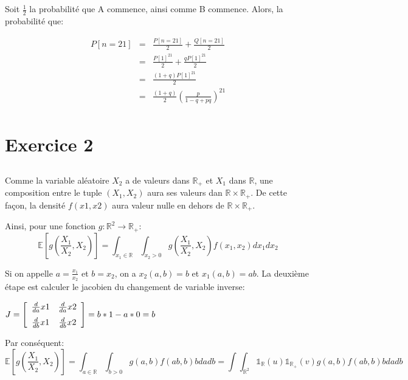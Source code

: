 \documentclass[a4paper]{article}
\begin{document}
\subsection{}
Soit $\frac{1}{2}$ la probabilité que A commence, ainsi comme B commence.
Alors, la probabilité que:

\begin{eqnarray*}
 P[n=21] &=&\frac{P[n=21]}{2}+\frac{Q[n=21]}{2}\\
 &=& \frac{P[1]^{21}}{2}+\frac{qP[1]^{21}}{2}\\
 &=& \frac{(1+q)P[1]^{21}}{2}\\
 &=& \frac{(1+q)}{2}(\frac{p}{1-q+pq})^{21}\\
\end{eqnarray*}



\section{Exercice 2 }
\subsection{}

Comme la variable aléatoire $X_2$ a de valeurs dans $\mathbb{R}_+$ et $X_1$ dans
$\mathbb{R}$, une composition  entre le tuple $(X_1 , X_2)$  aura ses valeurs dan
$\mathbb{R}\times\mathbb{R}_+$. De  cette façon,  la densité $f(x1,  x2)$ aura
valeur nulle en dehors de $\mathbb{R}\times\mathbb{R}_+$.

Ainsi, pour une fonction $g:\mathbb{R}^2 \rightarrow \mathbb{R}_+$:
\begin{equation}
 \mathbb{E}[g(\frac{X_1}{X_2},X_2)]=\int_{x_1 \in \mathbb{R}} \int_{x_2>0}g(\frac{X_1}{X_2},X_2)f(x_1,x_2)dx_1dx_2
\end{equation}

Si   on  appelle   $a=\frac{x_1}{x_2}$  et   $b=x_2$,  on   a   $x_2(a,b)=b$  et
$x_1(a,b)=ab$.   La deuxième  étape est  calculer le  jacobien du  changement de
variable inverse:

$J=\left[ \begin {array}{cc} {\frac {d}{da}}x1&{\frac {d}{da}}x2\\\noalign{\medskip}{\frac {d}{db}}x1&{\frac {d}{db}}x2\end {array}
\right] = b*1-a*0=b
$ 


Par conséquent:
\begin{equation}
 \mathbb{E}[g(\frac{X_1}{X_2},X_2)]=\int_{a            \in           \mathbb{R}}
 \int_{b>0}g(a,b)f(ab,b)bdadb=\int \int_{\mathbb{R}^2} \mathds{1}_\mathbb{R}(u)\mathds{1}_{\mathbb{R}_+}(v)g(a,b)f(ab,b)bdadb
\end{equation}
\end{document}
